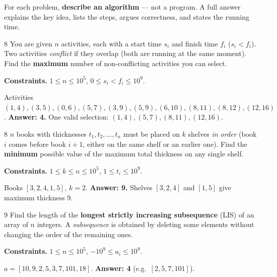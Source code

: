 \noindent For each problem, \textbf{describe an algorithm} --- not a program.
A full answer explains the key idea, lists the steps, argues correctness, and states the
running time.

\begin{problem}{8}
You are given $n$ activities, each with a start time $s_i$ and finish time
$f_i$ ($s_i < f_i$). Two activities \emph{conflict} if they overlap
(both are running at the same moment). Find the \textbf{maximum} number of
non-conflicting activities you can select.

\smallskip\noindent\textbf{Constraints.} $1 \le n \le 10^5$,
$0 \le s_i < f_i \le 10^9$.

\begin{example}
Activities $(1,4),(3,5),(0,6),(5,7),(3,9),(5,9),(6,10),(8,11),(8,12),
(12,16)$. \textbf{Answer: 4.}
One valid selection: $(1,4),(5,7),(8,11),(12,16)$.
\end{example}
\task
\end{problem}

\begin{problem}{8}
$n$ books with thicknesses $t_1, t_2, \dots, t_n$ must be placed on $k$
shelves \emph{in order} (book $i$ comes before book $i+1$, either on the same
shelf or an earlier one). Find the \textbf{minimum} possible value of the
maximum total thickness on any single shelf.

\smallskip\noindent\textbf{Constraints.} $1 \le k \le n \le 10^5$,
$1 \le t_i \le 10^9$.

\begin{example}
Books $[3,2,4,1,5]$, $k = 2$. \textbf{Answer: 9.}
Shelves $[3,2,4]$ and $[1,5]$ give maximum thickness 9.
\end{example}
\task
\end{problem}

\begin{problem}{9}
Find the length of the \textbf{longest strictly increasing subsequence}
(LIS) of an array of $n$ integers. A \emph{subsequence} is obtained by
deleting some elements without changing the order of the remaining ones.

\smallskip\noindent\textbf{Constraints.} $1 \le n \le 10^5$,
$-10^9 \le a_i \le 10^9$.

\begin{example}
$a = [10, 9, 2, 5, 3, 7, 101, 18]$. \textbf{Answer: 4}
(e.g.\ $[2, 5, 7, 101]$).
\end{example}
\task
\end{problem}

